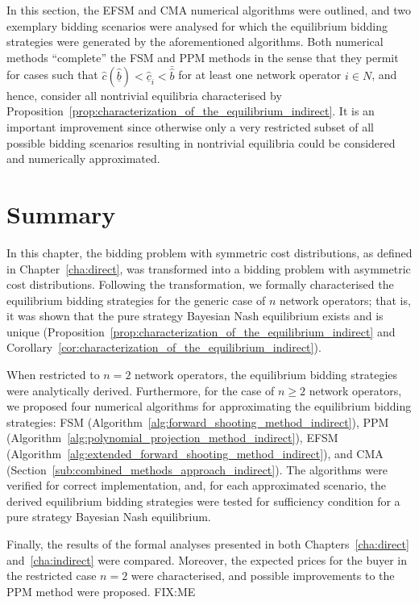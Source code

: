 In this section, the EFSM and CMA numerical algorithms were outlined, and two exemplary bidding scenarios were analysed for which the equilibrium bidding strategies were generated by the aforementioned algorithms. Both numerical methods ``complete'' the FSM and PPM methods in the sense that they permit for cases such that $\hat{c}(\underline{\hat{b}}) < \underline{\hat{c}}_i < \bar{\hat{b}}$ for at least one network operator $i\in N$, and hence, consider all nontrivial equilibria characterised by Proposition~\ref{prop:characterization_of_the_equilibrium_indirect}. It is an important improvement since otherwise only a very restricted subset of all possible bidding scenarios resulting in nontrivial equilibria could be considered and numerically approximated.

\section{Summary}
\label{sec:summary_indirect}
In this chapter, the bidding problem with symmetric cost distributions, as defined in Chapter~\ref{cha:direct}, was transformed into a bidding problem with asymmetric cost distributions. Following the transformation, we formally characterised the equilibrium bidding strategies for the generic case of $n$ network operators; that is, it was shown that the pure strategy Bayesian Nash equilibrium exists and is unique (Proposition~\ref{prop:characterization_of_the_equilibrium_indirect} and Corollary~\ref{cor:characterization_of_the_equilibrium_indirect}).

When restricted to $n=2$ network operators, the equilibrium bidding strategies were analytically derived. Furthermore, for the case of $n\geq 2$ network operators, we proposed four numerical algorithms for approximating the equilibrium bidding strategies: FSM (Algorithm~\ref{alg:forward_shooting_method_indirect}), PPM (Algorithm~\ref{alg:polynomial_projection_method_indirect}), EFSM (Algorithm~\ref{alg:extended_forward_shooting_method_indirect}), and CMA (Section~\ref{sub:combined_methods_approach_indirect}). The algorithms were verified for correct implementation, and, for each approximated scenario, the derived equilibrium bidding strategies were tested for sufficiency condition for a pure strategy Bayesian Nash equilibrium.

Finally, the results of the formal analyses presented in both Chapters~\ref{cha:direct} and~\ref{cha:indirect} were compared. Moreover, the expected prices for the buyer in the restricted case $n=2$ were characterised, and possible improvements to the PPM method were proposed. FIX:ME

